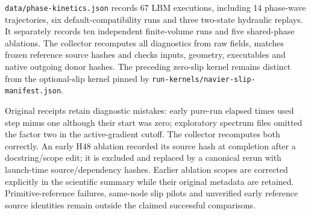 \texttt{data/phase-kinetics.json} records 67 LBM executions, including
14 phase-wave trajectories, six default-compatibility runs and three
two-state hydraulic replays. It separately records ten independent
finite-volume runs and five shared-phase ablations. The collector
recomputes all diagnostics from raw fields, matches frozen reference
source hashes and checks inputs, geometry, executables and native
outgoing donor hashes. The preceding zero-slip kernel remains distinct
from the optional-slip kernel pinned by
\texttt{run-kernels/navier-slip-manifest.json}.

Original receipts retain diagnostic mistakes: early pure-run elapsed times
used step minus one although their start was zero; exploratory spectrum
files omitted the factor two in the active-gradient cutoff. The collector
recomputes both correctly. An early H48 ablation recorded its source hash
at completion after a docstring/scope edit; it is excluded and replaced
by a canonical rerun with launch-time source/dependency hashes. Earlier
ablation scopes are corrected explicitly in the scientific summary while
their original metadata are retained. Primitive-reference failures,
same-node slip pilots and unverified early reference source identities
remain outside the claimed successful comparisons.
